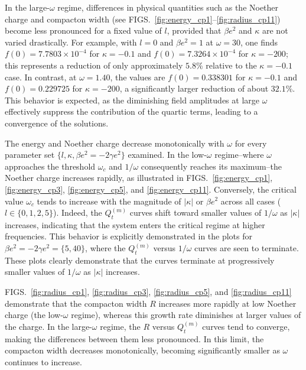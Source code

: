 \documentclass[aps,prd,superscriptaddress,notitlepage,11pt,final,longbibliography,nofootinbib]{revtex4-1}
\numberwithin{equation}{section}
\begin{document}
In the large-$\omega$ regime, differences in physical quantities such as the Noether charge and compacton width (see FIGS.~\ref{fig:energy_cp1}--\ref{fig:radius_cp11}) become less pronounced for a fixed value of $l$, provided that $\beta e^2$ and $\kappa$ are not varied drastically. For example, with $l=0$ and $\beta e^2=1$ at $\omega=30$, one finds $f(0)=7.7803 \times 10^{-4}$ for $\kappa=-0.1$ and $f(0)=7.3264 \times 10^{-4}$ for $\kappa=-200$; this represents a reduction of only approximately $5.8\%$ relative to the $\kappa=-0.1$ case. In contrast, at $\omega=1.40$, the values are $f(0)=0.338301$ for $\kappa=-0.1$ and $f(0)=0.229725$ for $\kappa=-200$, a significantly larger reduction of about $32.1\%$. This behavior is expected, as the diminishing field amplitudes at large $\omega$ effectively suppress the contribution of the quartic terms, leading to a convergence of the solutions.




The energy and Noether charge decrease monotonically with $\omega$ for every parameter set $\{l, \kappa, \beta e^2 = -2\gamma e^2\}$ examined. In the low-$\omega$ regime--where $\omega$ approaches the threshold $\omega_c$ and $1/\omega$ consequently reaches its maximum--the Noether charge increases rapidly, as illustrated in FIGS.~\ref{fig:energy_cp1}, \ref{fig:energy_cp3}, \ref{fig:energy_cp5}, and \ref{fig:energy_cp11}. Conversely, the critical value $\omega_c$ tends to increase with the magnitude of $|\kappa|$ or $\beta e^2$ across all cases ($l \in \{0, 1, 2, 5\}$). Indeed, the $Q_t^{(m)}$ curves shift toward smaller values of $1/\omega$ as $|\kappa|$ increases, indicating that the system enters the critical regime at higher frequencies. This behavior is explicitly demonstrated in the plots for $\beta e^2 =-2\gamma e^2= \{5, 40\}$, where the $Q_t^{(m)}$ versus $1/\omega$ curves are seen to terminate. These plots clearly demonstrate that the curves terminate at progressively smaller values of $1/\omega$ as $|\kappa|$ increases.



FIGS.~\ref{fig:radius_cp1}, \ref{fig:radius_cp3}, \ref{fig:radius_cp5}, and \ref{fig:radius_cp11} demonstrate that the compacton width $R$ increases more rapidly at low Noether charge (the low-$\omega$ regime), whereas this growth rate diminishes at larger values of the charge. In the large-$\omega$ regime, the $R$ versus $Q_t^{(m)}$ curves tend to converge, making the differences between them less pronounced. In this limit, the compacton width decreases monotonically, becoming significantly smaller as $\omega$ continues to increase.
\end{document}

